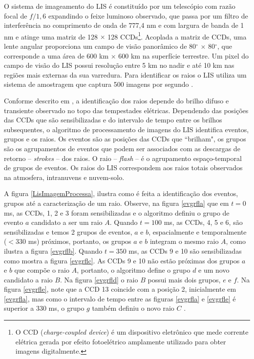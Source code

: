 O sistema de imageamento do LIS é constituído por um telescópio com razão focal de $f/1,6$ expandindo o feixe luminoso observado, que passa por um filtro de interferência no comprimento de onda de 777,4 nm e com largura de banda de 1 nm e atinge uma matriz de 128 $\times$ 128 CCDs\footnote{O CCD (\textit{charge-coupled device}) é um dispositivo eletrônico que mede corrente elétrica gerada por efeito fotoelétrico amplamente utilizado para obter imagens digitalmente.}. Acoplada a matriz de CCDs, uma lente angular proporciona um campo de visão panorâmico de 80$^{\circ}$ $\times$ 80$^{\circ}$, que corresponde a uma área de 600 km $\times$ 600 km na superfície terrestre. Um pixel do campo de visão do LIS possui resolução entre 5 km no nadir e até 10 km nas regiões mais externas da sua varredura. Para identificar os raios o LIS utiliza um sistema de amostragem que captura 500 imagens por segundo \cite{christian2000LISalgorithm,boccippio1996science,trmmhandbook}. 


Conforme descrito em , a identificação dos raios depende do brilho difuso e transiente observado no topo das tempestades elétricas. Dependendo das posições das CCDs que são sensibilizadas e do intervalo de tempo entre os brilhos subsequentes, o algoritmo de processamento de imagens do LIS identifica  eventos, grupos e os raios. Os eventos são as posições das CCDs que ``brilham", os grupos são os agrupamentos de eventos que podem ser associados com as descargas de retorno -- \textit{strokes} -- dos raios. O raio -- \textit{flash} -- é o agrupamento espaço-temporal de grupos de eventos. Os raios do LIS correspondem aos raios totais observados na atmosfera, intranuvens e nuvem-solo.

A figura \ref{LisImagemProcessa}, ilustra como é feita a identificação dos  eventos, grupos até a caracterização de um raio. Observe, na figura \ref{evgrfla} que em $t=0$ ms, as CCDs, 1, 2 e 3  foram sensibilizadas e o algoritmo definiu o grupo de evento $a$ candidato a ser um raio $A$.  Quando $t=100$ ms, as CCDs, 4, 5 e 6, são sensibilizadas e temos 2 grupos de eventos, $a$ e $b$, espacialmente e temporalmente ($<$330 ms) próximos, portanto, os grupos $a$ e $b$ integram o mesmo raio $A$, como ilustra a figura \ref{evgrflb}. Quando $t = 350$ ms, as CCDs 9 e 10 são sensibilizadas como mostra a figura \ref{evgrflc}. As CCDs 9 e 10 não estão próximas dos grupos $a$ e $b$ que compõe o raio $A$, portanto, o algoritmo define o grupo $d$ e um novo candidato a raio $B$. Na figura \ref{evgrfld} o raio $B$ possui mais dois grupos, $e$ e $f$. Na figura \ref{evgrfle}, note que a CCD 13 coincide com a posição 2, inicialmente em \ref{evgrfla}, mas como o intervalo de tempo entre as figuras \ref{evgrfla} e \ref{evgrfle} é superior a 330 ms, o grupo $g$ também definiu o novo raio $C$ \cite{christian2000LISalgorithm}.  


